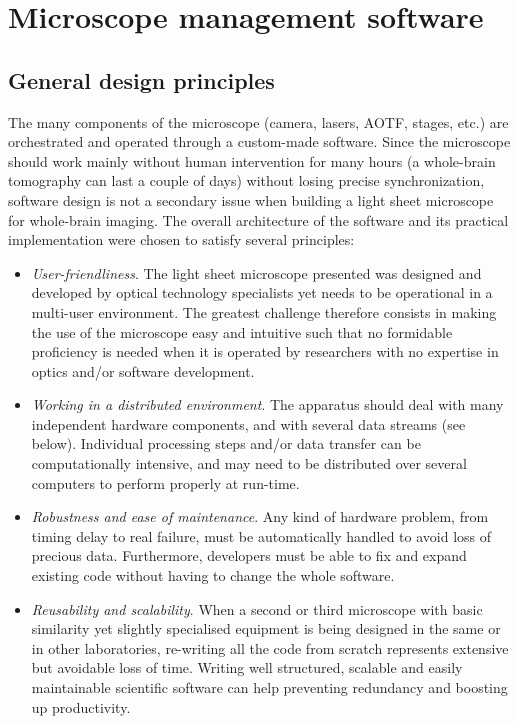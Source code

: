 \documentclass[12pt]{spieman}  %
\begin{document}
\section{Microscope management software}

\subsection{General design principles}

The many components of the microscope (camera, lasers, AOTF, stages, etc.) are orchestrated and operated through a custom-made software. Since the microscope should work mainly without human intervention for many hours (a whole-brain tomography can last a couple of days) without losing precise synchronization, software design is not a secondary issue when building a light sheet microscope for whole-brain imaging. The overall architecture of the software and its practical implementation were chosen to satisfy several principles:

\begin{itemize}
\item{\emph{User-friendliness}. The light sheet microscope presented was designed and developed by optical technology specialists yet needs to be operational in a multi-user environment. The greatest challenge therefore consists in making the use of the microscope easy and intuitive such that no formidable proficiency is needed when it is operated by researchers with no expertise in optics and/or software development.}
\item{\emph{Working in a distributed environment}. The apparatus should deal with many independent hardware components, and with several data streams (see below). Individual processing steps and/or data transfer can be computationally intensive, and may need to be distributed over several computers to perform properly at run-time.}
\item{\emph{Robustness and ease of maintenance}. Any kind of hardware problem, from timing delay to real failure, must be automatically handled to avoid loss of precious data. Furthermore, developers must be able to fix and expand existing code without having to change the whole software.}
\item{\emph{Reusability and scalability}. When a second or third microscope with basic similarity yet slightly specialised equipment is being designed in the same or in other laboratories, re-writing all the code from scratch represents extensive but avoidable loss of time. Writing well structured, scalable and easily maintainable scientific software can help preventing redundancy and boosting up productivity.}
\end{itemize}
\end{document}
